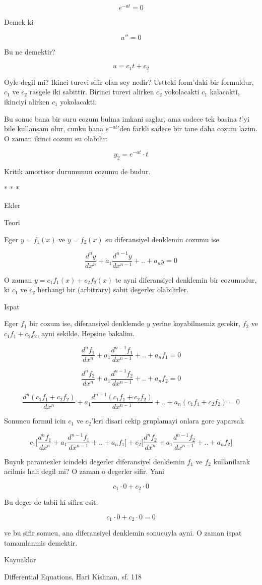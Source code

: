 \documentclass[12pt,fleqn]{article}
\begin{document}
\[ e^{-at} = 0 \]

Demek ki 

\[ u'' = 0 \]

Bu ne demektir?

\[ u = c_1t + c_2 \]

Oyle degil mi? Ikinci turevi sifir olan sey nedir? Ustteki form'daki bir
formuldur, $c_1$ ve $c_2$ rasgele iki sabittir. Birinci turevi alirken $c_2$
yokolacakti $c_1$ kalacakti, ikinciyi alirken $c_1$ yokolacakti. 

Bu sonuc bana bir suru cozum bulma imkani saglar, ama sadece tek basina
$t$'yi bile kullansam olur, cunku bana $e^{-at}$'den farkli sadece bir tane
daha cozum lazim. O zaman ikinci cozum su olabilir:

\[ y_2 = e^{-at} \cdot t \]

Kritik amortisor durumunun cozumu de budur. 

* * * 

Ekler

Teori

Eger $y=f_1(x)$ ve $y=f_2(x)$ su diferansiyel denklemin cozumu ise

\[ \frac{d^ny}{dx^n} + a_1 \frac{d^{n-1}y}{dx^{n-1}} + .. + a_n y = 0\]


O zaman $y=c_1f_1(x) + c_2f_2(x)$ te ayni diferansiyel denklemin bir
cozumudur, ki $c_1$ ve $c_2$ herhangi bir (arbitrary) sabit degerler olabilirler.

Ispat

Eger $f_1$ bir cozum ise, diferansiyel denklemde $y$ yerine koyabilmemiz
gerekir, $f_2$ ve $c_1f_1 + c_2f_2$, ayni sekilde. Hepsine bakalim.

\[ \frac{d^nf_1}{dx^n} + a_1 \frac{d^{n-1}f_1}{dx^{n-1}} + .. + a_n f_1 = 0\]

\[ \frac{d^nf_2}{dx^n} + a_1 \frac{d^{n-1}f_2}{dx^{n-1}} + .. + a_n f_2 = 0\]

\[ \frac{d^n(c_1f_1 + c_2f_2)}{dx^n} + 
a_1 \frac{d^{n-1}(c_1f_1 + c_2f_2)}{dx^{n-1}} + .. + 
a_n (c_1f_1 + c_2f_2) = 0
\]

Sonuncu formul icin $c_1$ ve $c_2$'leri disari cekip gruplamayi onlara gore
yaparsak

\[ 
c_1 \bigg[
\frac{d^nf_1}{dx^n} + a_1 \frac{d^{n-1}f_1}{dx^{n-1}} + .. + a_n f_1
\bigg] +
c_2 \bigg[
\frac{d^nf_2}{dx^n} + a_1 \frac{d^{n-1}f_2}{dx^{n-1}} + .. + a_n f_2
\bigg]
 \]

Buyuk parantezler icindeki degerler diferansiyel denklemin $f_1$ ve $f_2$
kullanilarak acilmis hali degil mi? O zaman o degerler sifir. Yani

\[ c_1 \cdot 0 + c_2 \cdot 0 \]

Bu deger de tabii ki sifira esit. 

\[ c_1 \cdot 0 + c_2 \cdot 0 = 0\]

ve bu sifir sonucu, ana diferansiyel denklemin sonucuyla ayni. O zaman
ispat tamamlanmis demektir.

Kaynaklar 

Differential Equations, Hari Kishnan, sf. 118
\end{document}
